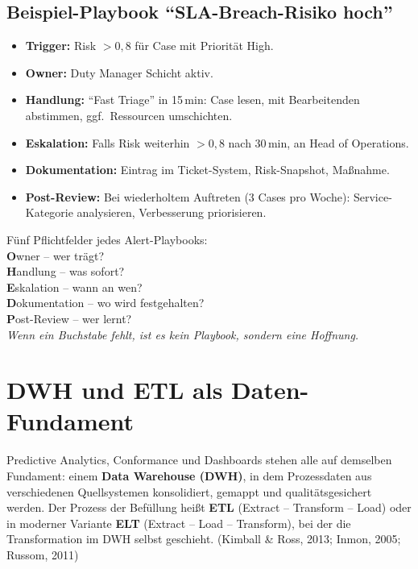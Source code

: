 \documentclass[11pt,a4paper,oneside]{article}
\newcommand{\caveatfontfallback}{\itshape}
\newcommand\caveatfont{\caveatfontfallback}%
\newcommand{\akzent}[1]{{\caveatfont\color{lpAmber}#1}}
\newcommand{\fachbegriff}[1]{\textbf{#1}}
\newcommand{\quelle}[1]{{\footnotesize\color{lpGray}(#1)}}
\begin{document}
\subsection{Beispiel-Playbook ``SLA-Breach-Risiko hoch''}

\begin{itemize}
  \item \textbf{Trigger:} Risk $>0,8$ für Case mit Priorität High.
  \item \textbf{Owner:} Duty Manager Schicht aktiv.
  \item \textbf{Handlung:} ``Fast Triage'' in 15\,min: Case lesen, mit Bearbeitenden abstimmen, ggf.\ Ressourcen umschichten.
  \item \textbf{Eskalation:} Falls Risk weiterhin $>0,8$ nach 30\,min, an Head of Operations.
  \item \textbf{Dokumentation:} Eintrag im Ticket-System, Risk-Snapshot, Maßnahme.
  \item \textbf{Post-Review:} Bei wiederholtem Auftreten (3 Cases pro Woche): Service-Kategorie analysieren, Verbesserung priorisieren.
\end{itemize}

\begin{eselsbox}[Eselsbrücke: \akzent{O-H-E-D-P}]
Fünf Pflichtfelder jedes Alert-Playbooks:\\[2pt]
\textbf{O}wner -- wer trägt?\\
\textbf{H}andlung -- was sofort?\\
\textbf{E}skalation -- wann an wen?\\
\textbf{D}okumentation -- wo wird festgehalten?\\
\textbf{P}ost-Review -- wer lernt?\\[2pt]
\emph{Wenn ein Buchstabe fehlt, ist es kein Playbook, sondern eine Hoffnung.}
\end{eselsbox}

\section{DWH und ETL als Daten-Fundament}

Predictive Analytics, Conformance und Dashboards stehen alle auf demselben Fundament: einem \fachbegriff{Data Warehouse (DWH)}, in dem Prozessdaten aus verschiedenen Quellsystemen konsolidiert, gemappt und qualitätsgesichert werden. Der Prozess der Befüllung heißt \fachbegriff{ETL} (Extract -- Transform -- Load) oder in moderner Variante \fachbegriff{ELT} (Extract -- Load -- Transform), bei der die Transformation im DWH selbst geschieht. \quelle{Kimball \& Ross, 2013; Inmon, 2005; Russom, 2011}
\end{document}
